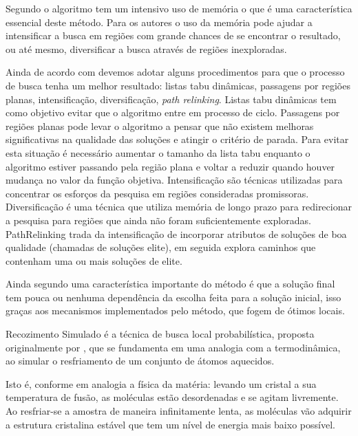 \documentclass{abntpuc}
\begin{document}
Segundo \cite{armentanointroduccao}  o algoritmo tem um intensivo uso de memória o que é uma característica essencial deste método. Para os autores o uso da memória pode ajudar a intensificar a busca em regiões com grande chances de se encontrar o resultado, ou até mesmo, diversificar a busca através de regiões inexploradas.

Ainda de acordo com \cite{armentanointroduccao}  devemos adotar alguns procedimentos para que o processo de busca tenha um melhor resultado: listas tabu dinâmicas, passagens por regiões planas, intensificação, diversificação, \textit{path relinking}. Listas tabu dinâmicas tem como objetivo evitar que o algoritmo entre em processo de ciclo. Passagens por regiões planas pode levar o algoritmo a pensar que não existem melhoras significativas na qualidade das soluções e atingir o critério de parada. Para evitar esta situação é necessário aumentar o tamanho da lista tabu enquanto o algoritmo estiver passando pela região plana e voltar a reduzir quando houver mudança no valor da função objetiva. Intensificação são técnicas utilizadas para concentrar os esforços da pesquisa em regiões consideradas promissoras. Diversificação é uma técnica que utiliza memória de longo prazo para redirecionar a pesquisa para regiões que ainda não foram suficientemente exploradas. PathRelinking trada da intensificação de incorporar atributos de soluções de boa qualidade (chamadas de soluções elite), em seguida explora caminhos que contenham uma ou mais soluções de elite.

Ainda segundo \cite{armentanointroduccao} uma característica importante do método é que a solução final tem pouca ou nenhuma dependência da escolha feita para a solução inicial, isso graças aos mecanismos implementados pelo método, que fogem de ótimos locais.


Recozimento Simulado é a técnica de busca local probabilística, proposta originalmente por \cite{kirkpatrick1983optimization}, que se fundamenta em uma analogia com a termodinâmica, ao simular o 
resfriamento de um conjunto de átomos aquecidos.\par 

Isto é, conforme \cite{noronha2003abordagem} em analogia a física da matéria: levando um cristal a sua temperatura de fusão, as moléculas estão desordenadas e se agitam livremente. Ao resfriar-se a amostra de maneira infinitamente lenta, as moléculas vão adquirir a estrutura cristalina estável que tem um nível de energia mais baixo possível.\par 
\end{document}
